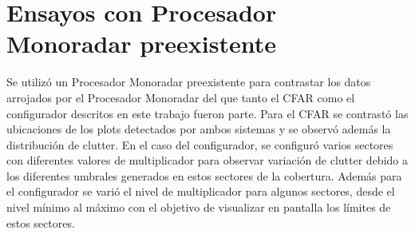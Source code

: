 \section{Ensayos con Procesador Monoradar preexistente}
\label{Ensayos_Procesador_Monoradar_preexistente}
Se utilizó un Procesador Monoradar preexistente para contrastar los datos arrojados por el Procesador Monoradar del que tanto el CFAR como el configurador descritos en este trabajo fueron parte. Para el CFAR se contrastó las ubicaciones de los plots detectados por ambos sistemas y se observó además la distribución de clutter. En el caso del configurador, se configuró varios sectores con diferentes valores de multiplicador para observar variación de clutter debido a los diferentes umbrales generados en estos sectores de la cobertura. Además para el configurador se varió el nivel de multiplicador  para algunos sectores, desde el nivel mínimo al máximo con el objetivo de visualizar en pantalla los límites de estos sectores.






